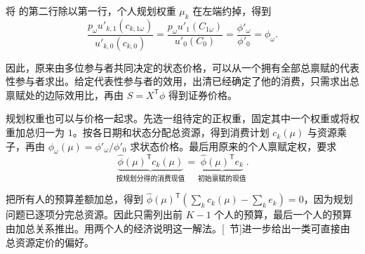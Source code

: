 将 的第二行除以第一行，个人规划权重 $\mu_k$ 在左端约掉，得到
\[
 \frac{p_\omega u'_{k,1}(c_{k,1\omega})}{u'_{k,0}(c_{k,0})}
 =\frac{p_\omega u'_1(C_{1\omega})}{u'_0(C_0)}
 =\frac{\phi'_\omega}{\phi'_0}
 =\phi_\omega.
\]

因此，原来由多位参与者共同决定的状态价格，可以从一个拥有全部总禀赋的代表性参与者求出。给定代表性参与者的效用，出清已经确定了他的消费，只需求出总禀赋处的边际效用比，再由 $S=X^{\mathsf T}\phi$ 得到证券价格。

规划权重也可以与价格一起求。先选一组待定的正权重，固定其中一个权重或将权重加总归一为 $1$。按各日期和状态分配总资源，得到消费计划 $c_k(\mu)$ 与资源乘子，再由 $\phi_\omega(\mu)=\phi'_\omega/\phi'_0$ 求状态价格。最后用原来的个人禀赋定权，要求
\begin{equation*}
 \underbrace{\widehat\phi(\mu)^{\mathsf T}c_k(\mu)}_{\text{按规划分得的消费现值}}
 =\underbrace{\widehat\phi(\mu)^{\mathsf T}e_k}_{\text{初始禀赋的现值}}.
 \tag{10.I}\label{eq:wj-10-weight-budget}
\end{equation*}

把所有人的预算差额加总，得到 $\widehat\phi(\mu)^{\mathsf T}(\sum_k c_k(\mu)-\sum_k e_k)=0$，因为规划问题已逐项分完总资源。因此只需列出前 $K-1$ 个人的预算，最后一个人的预算由加总关系推出。用两个人的经济说明这一解法。[~节]进一步给出一类可直接由总资源定价的偏好。

